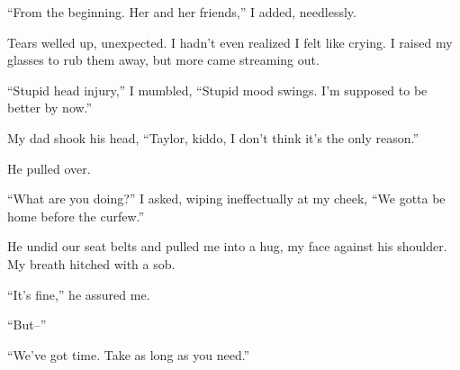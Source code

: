 ``From the beginning. Her and her friends,'' I added, needlessly.



Tears welled up, unexpected.  I hadn't even realized I felt like crying.  I raised my glasses to rub them away, but more came streaming out.



``Stupid head injury,'' I mumbled, ``Stupid mood swings.  I'm supposed to be better by now.''



My dad shook his head, ``Taylor, kiddo, I don't think it's the only reason.''



He pulled over.



``What are you doing?'' I asked, wiping ineffectually at my cheek, ``We gotta be home before the curfew.''



He undid our seat belts and pulled me into a hug, my face against his shoulder.  My breath hitched with a sob.



``It's fine,'' he assured me.



``But--''



``We've got time.  Take as long as you need.''





